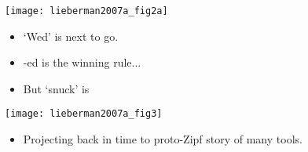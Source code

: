 \begin{frame}

  \begin{block}{}
    \begin{center}
      \texttt{[image: lieberman2007a\_fig2a]}
    \end{center}

  \begin{itemize}
  \item 
    `Wed' is next to go.
  \item 
    -ed is the winning rule...
  \item<+->
    But `snuck' is 
    \cite{michel2010a}
  \end{itemize}
  \end{block}

\end{frame}


\begin{frame}

  \begin{block}{}
    \begin{center}
      \texttt{[image: lieberman2007a\_fig3]}
    \end{center}

  \begin{itemize}
  \item Projecting back in time to proto-Zipf story of many tools.
  \end{itemize}
  \end{block}

\end{frame}


